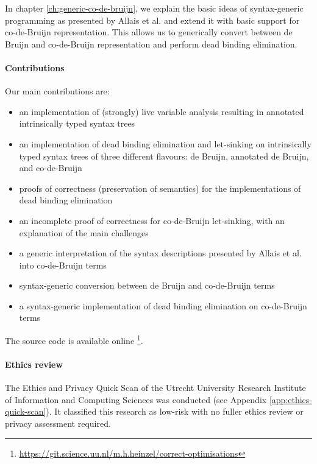     In chapter \ref{ch:generic-co-de-bruijn}, we explain the basic ideas of syntax-generic programming
    as presented by Allais et al.
    \cite{Allais2018UniverseOfSyntaxes}
    and extend it with basic support for co-de-Bruijn representation.
    This allows us to generically convert between de Bruijn and co-de-Bruijn representation
    and perform dead binding elimination.

  \paragraph{Contributions}
    Our main contributions are:
    \begin{itemize}
      \item an implementation of (strongly) live variable analysis resulting in annotated intrinsically typed syntax trees
      \item an implementation of dead binding elimination and let-sinking on intrinsically typed syntax trees of three different flavours: de Bruijn, annotated de Bruijn, and co-de-Bruijn
      \item proofs of correctness (preservation of semantics) for the implementations of dead binding elimination
      \item an incomplete proof of correctness for co-de-Bruijn let-sinking, with an explanation of the main challenges
      \item a generic interpretation of the syntax descriptions presented by Allais et al. \cite{Allais2018UniverseOfSyntaxes} into co-de-Bruijn terms
      \item syntax-generic conversion between de Bruijn and co-de-Bruijn terms
      \item a syntax-generic implementation of dead binding elimination on co-de-Bruijn terms
    \end{itemize}
    The source code is available online%
    \footnote{\url{https://git.science.uu.nl/m.h.heinzel/correct-optimisations}}.

  \paragraph{Ethics review}
    The Ethics and Privacy Quick Scan of the Utrecht University Research Institute of Information and Computing Sciences was conducted (see Appendix \ref{app:ethics-quick-scan}).
    It classified this research as low-risk with no fuller ethics review or privacy assessment required.
